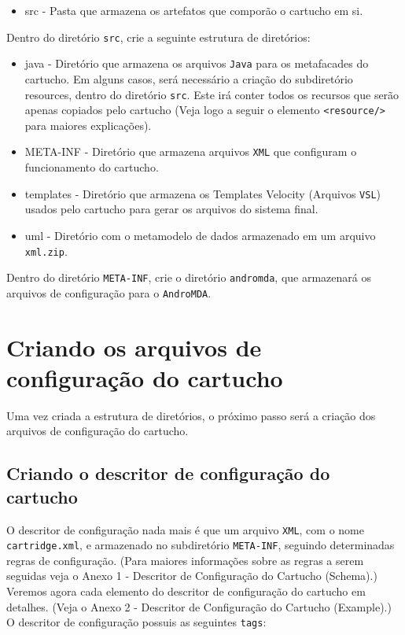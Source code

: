 \begin{itemize}
  \item src - Pasta que armazena os artefatos que comporão o cartucho em si.
\end{itemize}

Dentro do diretório \texttt{src}, crie a seguinte estrutura de diretórios:

\begin{itemize}
  \item java - Diretório que armazena os arquivos \texttt{Java} para os
  metafacades do cartucho. Em alguns casos, será necessário a criação do
  subdiretório resources, dentro do diretório \texttt{src}. Este irá conter
  todos os recursos que serão apenas copiados pelo cartucho (Veja logo a seguir
  o elemento \texttt{<resource/>} para maiores explicações).
  \item META-INF - Diretório que armazena arquivos \texttt{XML} que configuram o
  funcionamento do cartucho.
  \item templates - Diretório que armazena os Templates Velocity (Arquivos
  \texttt{VSL}) usados pelo cartucho para gerar os arquivos do sistema final.
  \item uml - Diretório com o metamodelo de dados armazenado em um
	arquivo \texttt{xml.zip}.
\end{itemize}

Dentro do diretório \texttt{META-INF}, crie o diretório \texttt{andromda}, que
armazenará os arquivos de configuração para o \texttt{AndroMDA}.

\section{Criando os arquivos de configuração do cartucho}
Uma vez criada a estrutura de diretórios, o próximo passo será a criação dos
arquivos de configuração do cartucho. 

\subsection{Criando o descritor de configuração do cartucho}
O descritor de configuração nada mais é que um arquivo \texttt{XML}, com o nome
\texttt{cartridge.xml},  e armazenado no subdiretório \texttt{META-INF}, 
seguindo determinadas regras de configuração. (Para maiores informações sobre as
regras a serem seguidas veja o Anexo 1 - Descritor de Configuração do Cartucho
(Schema).) Veremos agora cada elemento do descritor de configuração do cartucho
em detalhes. (Veja o Anexo 2 - Descritor de Configuração do Cartucho (Example).)
O descritor de configuração possuis as seguintes \texttt{tags}:

